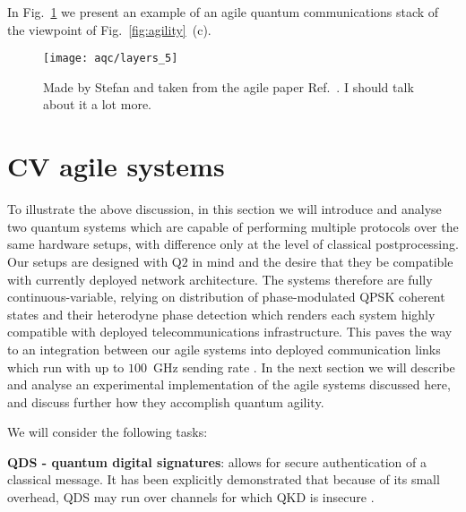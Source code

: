 
In Fig.~\ref{fig:big_agile} we present an example of an agile quantum communications stack of the viewpoint of Fig.~\ref{fig:agility}~(c). 

\begin{figure}[htp]
\centering
\texttt{[image: aqc/layers\_5]}
\caption{\label{fig:big_agile} Made by Stefan and taken from the agile paper Ref.~\cite{Richter2020}. I should talk about it a lot more.}
\end{figure}

\clearpage
\section{CV agile systems}

To illustrate the above discussion, in this section we will introduce and analyse two quantum systems which are capable of performing multiple protocols over the same hardware setups, with difference only at the level of classical postprocessing. Our setups are designed with Q$2$ in mind and the desire that they be compatible with currently deployed network architecture. The systems therefore are fully continuous-variable, relying on distribution of phase-modulated QPSK coherent states and their heterodyne phase detection  which renders each system highly compatible with deployed telecommunications infrastructure. This paves the way to an integration between our agile systems into deployed communication links which run with up to $100$~GHz sending rate . In the next section we will describe and analyse an experimental implementation of the agile systems discussed here, and discuss further how they accomplish quantum agility.

We will consider the following tasks:

\textbf{QDS - quantum digital signatures}: allows for secure authentication of a classical message. It has been explicitly demonstrated that because of its small overhead, QDS may run over channels for which QKD is insecure \cite{Amiri2016}.

